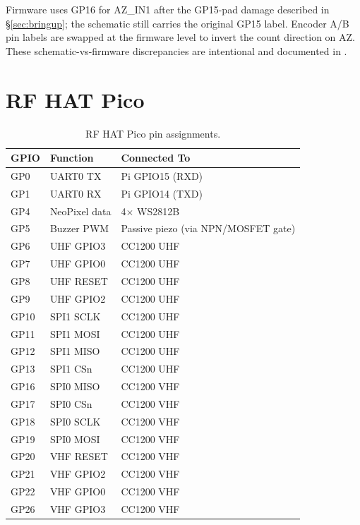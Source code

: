 Firmware uses GP16 for AZ\_IN1 after the GP15-pad damage described in \S\ref{sec:bringup}; the schematic still carries the original GP15 label. Encoder A/B pin labels are swapped at the firmware level to invert the count direction on AZ. These schematic-vs-firmware discrepancies are intentional and documented in .

\section*{RF HAT Pico}

\begin{table}[H]
    \centering
    \begin{tabularx}{\textwidth}{llX}
        \toprule
        GPIO & Function & Connected To \\
        \midrule
        GP0  & UART0 TX        & Pi GPIO15 (RXD) \\
        GP1  & UART0 RX        & Pi GPIO14 (TXD) \\
        GP4  & NeoPixel data   & 4$\times$ WS2812B \\
        GP5  & Buzzer PWM      & Passive piezo (via NPN/MOSFET gate) \\
        GP6  & UHF GPIO3       & CC1200 UHF \\
        GP7  & UHF GPIO0       & CC1200 UHF \\
        GP8  & UHF RESET       & CC1200 UHF \\
        GP9  & UHF GPIO2       & CC1200 UHF \\
        GP10 & SPI1 SCLK       & CC1200 UHF \\
        GP11 & SPI1 MOSI       & CC1200 UHF \\
        GP12 & SPI1 MISO       & CC1200 UHF \\
        GP13 & SPI1 CSn        & CC1200 UHF \\
        GP16 & SPI0 MISO       & CC1200 VHF \\
        GP17 & SPI0 CSn        & CC1200 VHF \\
        GP18 & SPI0 SCLK       & CC1200 VHF \\
        GP19 & SPI0 MOSI       & CC1200 VHF \\
        GP20 & VHF RESET       & CC1200 VHF \\
        GP21 & VHF GPIO2       & CC1200 VHF \\
        GP22 & VHF GPIO0       & CC1200 VHF \\
        GP26 & VHF GPIO3       & CC1200 VHF \\
        \bottomrule
    \end{tabularx}
    \caption{RF HAT Pico pin assignments.}
\end{table}
